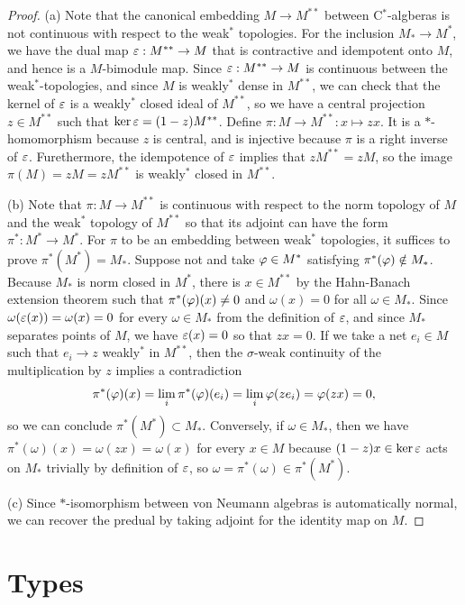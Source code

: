 \documentclass{../../large}
\begin{document}
\begin{proof}
(a)
Note that the canonical embedding $M\to M^{**}$ between C$^*$-algberas is not continuous with respect to the weak$^*$ topologies.
For the inclusion $M_*\to M^*$, we have the dual map $\varepsilon:M^{**}\to M$ that is contractive and idempotent onto $M$, and hence is a $M$-bimodule map.
Since $\varepsilon:M^{**}\to M$ is continuous between the weak$^*$-topologies, and since $M$ is weakly$^*$ dense in $M^{**}$, we can check that the kernel of $\varepsilon$ is a weakly$^*$ closed ideal of $M^{**}$, so we have a central projection $z\in M^{**}$ such that $\ker\varepsilon=(1-z)M^{**}$.
Define $\pi:M\to M^{**}:x\mapsto zx$.
It is a $*$-homomorphism because $z$ is central, and is injective because $\pi$ is a right inverse of $\varepsilon$.
Furethermore, the idempotence of $\varepsilon$ implies that $zM^{**}=zM$, so the image $\pi(M)=zM=zM^{**}$ is weakly$^*$ closed in $M^{**}$.

(b)
Note that $\pi:M\to M^{**}$ is continuous with respect to the norm topology of $M$ and the weak$^*$ topology of $M^{**}$ so that its adjoint can have the form $\pi^*:M^*\to M^*$.
For $\pi$ to be an embedding between weak$^*$ topologies, it suffices to prove $\pi^*(M^*)=M_*$.
Suppose not and take $\varphi\in M^*$ satisfying $\pi^*(\varphi)\notin M_*$.
Because $M_*$ is norm closed in $M^*$, there is $x\in M^{**}$ by the Hahn-Banach extension theorem such that $\pi^*(\varphi)(x)\ne0$ and $\omega(x)=0$ for all $\omega\in M_*$.
Since $\omega(\varepsilon(x))=\omega(x)=0$ for every $\omega\in M_*$ from the definition of $\varepsilon$, and since $M_*$ separates points of $M$, we have $\varepsilon(x)=0$ so that $zx=0$.
If we take a net $e_i\in M$ such that $e_i\to z$ weakly$^*$ in $M^{**}$, then the $\sigma$-weak continuity of the multiplication by $z$ implies a contradiction
\[\pi^*(\varphi)(x)=\lim_i\pi^*(\varphi)(e_i)=\lim_i\varphi(ze_i)=\varphi(zx)=0,\]
so we can conclude $\pi^*(M^*)\subset M_*$.
Conversely, if $\omega\in M_*$, then we have $\pi^*(\omega)(x)=\omega(zx)=\omega(x)$ for every $x\in M$ because $(1-z)x\in\ker\varepsilon$ acts on $M_*$ trivially by definition of $\varepsilon$, so $\omega=\pi^*(\omega)\in\pi^*(M^*)$.

(c)
Since $*$-isomorphism between von Neumann algebras is automatically normal, we can recover the predual by taking adjoint for the identity map on $M$.
\end{proof}


\section{Types}
\end{document}
